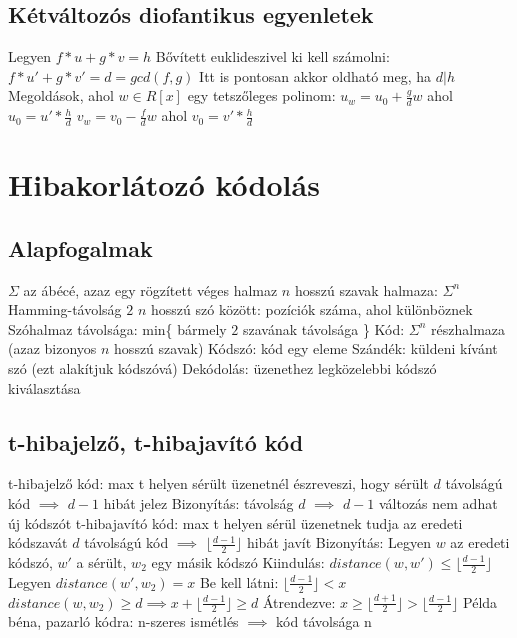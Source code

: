 \documentclass[12pt,a4paper]{article}
\begin{document}
\subsection{Kétváltozós diofantikus egyenletek}

\begin{outline}
	\1 Legyen $f*u+g*v=h$
	\1 Bővített euklideszivel ki kell számolni: $f*u'+g*v'=d=gcd(f,g)$
		\2 Itt is pontosan akkor oldható meg, ha $d|h$
	\1 Megoldások, ahol $w \in R[x]$ egy tetszőleges polinom:
		\2 $u_w = u_0+\frac{g}{d}w$ ahol $u_0=u'*\frac{h}{d}$
		\2 $v_w = v_0-\frac{f}{d}w$ ahol $v_0=v'*\frac{h}{d}$
\end{outline}

\pagebreak

\section{Hibakorlátozó kódolás}

\subsection{Alapfogalmak}

\begin{outline}
	\1 $\Sigma$ az ábécé, azaz egy rögzített véges halmaz
		\2 $n$ hosszú szavak halmaza: $\Sigma^n$
	\1 Hamming-távolság $2$ $n$ hosszú szó között: pozíciók száma, ahol különböznek
		\2 Szóhalmaz távolsága: min\{ bármely $2$ szavának távolsága \}
	\1 Kód: $\Sigma^n$ részhalmaza (azaz bizonyos $n$ hosszú szavak)
		\2 Kódszó: kód egy eleme
	\1 Szándék: küldeni kívánt szó (ezt alakítjuk kódszóvá)
	\1 Dekódolás: üzenethez legközelebbi kódszó kiválasztása
\end{outline}

\subsection{t-hibajelző, t-hibajavító kód}

\begin{outline}
	\1 t-hibajelző kód: max t helyen sérült üzenetnél észreveszi, hogy sérült
		\2 $d$ távolságú kód $\implies$ $d-1$ hibát jelez
		\2 Bizonyítás: távolság $d$ $\implies$ $d-1$ változás nem adhat új kódszót
	\1 t-hibajavító kód: max t helyen sérül üzenetnek tudja az eredeti kódszavát
		\2 $d$ távolságú kód $\implies$ $\lfloor \frac{d-1}{2} \rfloor$ hibát javít
		\2 Bizonyítás:
			\3 Legyen $w$ az eredeti kódszó, $w'$ a sérült, $w_2$ egy másik kódszó
			\3 Kiindulás: $distance(w,w') \le \lfloor \frac{d-1}{2} \rfloor$
			\3 Legyen $distance(w',w_2)=x$
			\3 Be kell látni: $\lfloor \frac{d-1}{2} \rfloor < x$
			\3 $distance(w,w_2) \ge d \implies x + \lfloor \frac{d-1}{2} \rfloor \ge d$
			\3 Átrendezve: $x \ge \lfloor \frac{d+1}{2} \rfloor > \lfloor \frac{d-1}{2} \rfloor$
	\1 Példa béna, pazarló kódra: n-szeres ismétlés $\implies$ kód távolsága n
\end{outline}
\end{document}
